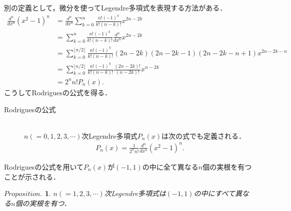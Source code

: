 \documentclass[a4j,papersize,disablejfam,slide,14pt]{jsarticle}
\newtheorem{Prop}{$Proposition.$}
\begin{document}
    別の定義として，微分を使って{\rm Legendre}多項式を表現する方法がある．
    \begin{align}
    	\frac{d^n}{dx^n}(x^2-1)^n &= \frac{d^n}{dx^n} \sum_{k=0}^{n} \frac{n! (-1)^k}{k! (n-k)!} x^{2n-2k} \\
        &= \sum_{k=0}^{n} \frac{n! (-1)^k}{k! (n-k)!} \frac{d^n}{dx^n} x^{2n-2k} \\
        &= \sum_{k=0}^{\lfloor n/2 \rfloor} \frac{n! (-1)^k}{k! (n-k)!} (2n-2k)(2n-2k-1)(2n-2k-n+1) x^{2n-2k-n} \\
        &= \sum_{k=0}^{\lfloor n/2 \rfloor} \frac{n! (-1)^k}{k! (n-k)!} \frac{(2n-2k)!}{(n-2k)!} x^{n-2k} \\
        &= 2^n n! P_n(x).
    \end{align}
    こうして{\rm Rodrigues}の公式を得る．
    \begin{screen}
    	\begin{description}
        	\item[{\rm Rodrigues}の公式]\mbox{}\\
            $n(=0,1,2,3,\cdots)$次{\rm Legendre}多項式$P_n(x)$は次の式でも定義される．
            \begin{align}
            	P_n(x) = \frac{1}{2^n n!} \frac{d^n}{dx^n}(x^2-1)^n. \label{eq:rodrigues}
            \end{align}
        \end{description}
    \end{screen}
    {\rm Rodrigues}の公式を用いて$P_n(x)$が$(-1, 1)$の中に全て異なる$n$個の実根を有つことが示される．
    \begin{screen}
    	\begin{Prop}
        	$n(=1,2,3,\cdots)$次{\rm Legendre}多項式は$(-1, 1)$の中にすべて異なる$n$個の実根を有つ．
        \end{Prop}
    \end{screen}
\end{document}
